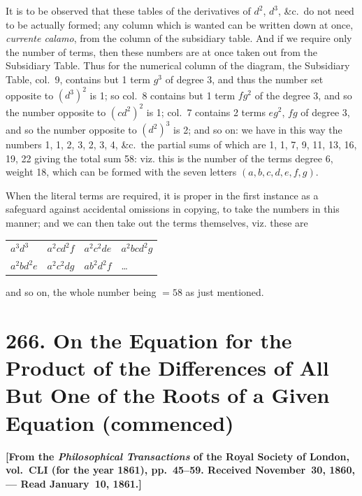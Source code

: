 \documentclass[11pt,a4paper]{article}
\theoremstyle{definition}
\begin{document}
It is to be observed that these tables of the derivatives of $d^2$, $d^3$, \&c.\ do not need to be actually formed; any column which is wanted can be written down at once, \textit{currente calamo}, from the column of the subsidiary table. And if we require only the number of terms, then these numbers are at once taken out from the Subsidiary Table. Thus for the numerical column of the diagram, the Subsidiary Table, col.~9, contains but 1 term $g^3$ of degree 3, and thus the number set opposite to $(d^3)^2$ is 1; so col.~8 contains but 1 term $fg^2$ of the degree 3, and so the number opposite to $(c\!d^2)^2$ is 1; col.~7 contains 2 terms $eg^2$, $fg$ of degree 3, and so the number opposite to $(d^2)^3$ is 2; and so on: we have in this way the numbers 1, 1, 2, 3, 2, 3, 4, \&c.\ the partial sums of which are 1, 1, 7, 9, 11, 13, 16, 19, 22 giving the total sum 58: viz. this is the number of the terms degree 6, weight 18, which can be formed with the seven letters $(a,b,c,d,e,f,g)$.

When the literal terms are required, it is proper in the first instance as a safeguard against accidental omissions in copying, to take the numbers in this manner; and we can then take out the terms themselves, viz. these are
\begin{center}
\begin{tabular}{llll}
$a^3d^3$ & $a^2cd^2f$ & $a^2c^2de$ & $a^2bcd^2g$ \\
$a^2bd^2e$ & $a^2c^2dg$ & $ab^2d^2f$ & \ldots \\
\end{tabular}
\end{center}
and so on, the whole number being $=58$ as just mentioned.

\newpage
\section[266. Equation for the Product of the Differences]{266. On the Equation for the Product of the Differences of All But One of the Roots of a Given Equation (commenced)}

\textbf{[From the \textit{Philosophical Transactions} of the Royal Society of London, vol.~CLI (for the year 1861), pp.~45--59. Received November~30, 1860, --- Read January~10, 1861.]}
\end{document}
